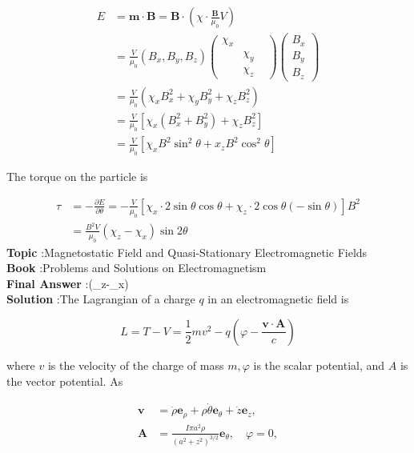 \documentclass[10pt]{article}
\begin{document}
$$
\begin{aligned}
E &=\mathbf{m} \cdot \mathbf{B}=\mathbf{B} \cdot\left(\chi \cdot \frac{\mathbf{B}}{\mu_{0}} V\right) \\
&=\frac{V}{\mu_{0}}\left(B_{x}, B_{y}, B_{z}\right)\left(\begin{array}{ccc}
\chi_{x} & \\
& \chi_{y} & \\
& \chi_{z}
\end{array}\right)\left(\begin{array}{l}
B_{x} \\
B_{y} \\
B_{z}
\end{array}\right) \\
&=\frac{V}{\mu_{0}}\left(\chi_{x} B_{x}^{2}+\chi_{y} B_{y}^{2}+\chi_{z} B_{z}^{2}\right) \\
&=\frac{V}{\mu_{0}}\left[\chi_{x}\left(B_{x}^{2}+B_{y}^{2}\right)+\chi_{z} B_{z}^{2}\right] \\
&=\frac{V}{\mu_{0}}\left[\chi_{x} B^{2} \sin ^{2} \theta+x_{z} B^{2} \cos ^{2} \theta\right]
\end{aligned}
$$

 The torque on the particle is

$$
\begin{aligned}
\tau &=-\frac{\partial E}{\partial \theta}=-\frac{V}{\mu_{0}}\left[\chi_{x} \cdot 2 \sin \theta \cos \theta+\chi_{z} \cdot 2 \cos \theta(-\sin \theta)\right] B^{2} \\
&=\frac{B^{2} V}{\mu_{0}}\left(\chi_{z}-\chi_{x}\right) \sin 2 \theta
\end{aligned}
$$
\textbf{Topic} :Magnetostatic Field and Quasi-Stationary Electromagnetic Fields\\
\textbf{Book} :Problems and Solutions on Electromagnetism\\
\textbf{Final Answer} :\left(\chi_{z}-\chi_{x}\right)  \theta\\


\textbf{Solution} :The Lagrangian of a charge $q$ in an electromagnetic field is

$$
L=T-V=\frac{1}{2} m v^{2}-q\left(\varphi-\frac{\mathbf{v} \cdot \mathbf{A}}{c}\right)
$$

where $v$ is the velocity of the charge of mass $m, \varphi$ is the scalar potential, and $A$ is the vector potential. As

$$
\begin{aligned}
\mathbf{v} &=\dot{\rho} \mathbf{e}_{\rho}+\rho \dot{\theta} \mathbf{e}_{\theta}+\dot{z} \mathbf{e}_{z}, \\
\mathbf{A} &=\frac{I \pi a^{2} \rho}{\left(a^{2}+z^{2}\right)^{3 / 2}} \mathbf{e}_{\theta}, \quad \varphi=0,
\end{aligned}
$$
\end{document}
